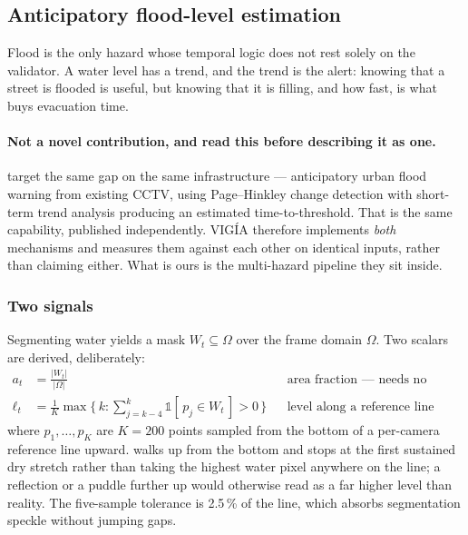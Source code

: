 \subsection{Anticipatory flood-level estimation}
\label{sec:flood-trend}

Flood is the only hazard whose temporal logic does not rest solely on the
validator. A water level has a trend, and the trend is the alert: knowing that
a street is flooded is useful, but knowing that it is filling, and how fast,
is what buys evacuation time.

\paragraph{Not a novel contribution, and read this before describing it as
one.}  target the same gap on the same
infrastructure — anticipatory urban flood warning from existing CCTV, using
Page--Hinkley change detection with short-term trend analysis producing an
estimated time-to-threshold. That is the same capability, published
independently. VIGÍA therefore implements \emph{both} mechanisms and measures
them against each other on identical inputs, rather than claiming either. What
is ours is the multi-hazard pipeline they sit inside.

\subsubsection{Two signals}

Segmenting water yields a mask $W_t \subseteq \Omega$ over the frame domain
$\Omega$. Two scalars are derived, deliberately:
\begin{align}
  a_t &= \frac{|W_t|}{|\Omega|}
     &&\text{area fraction — needs no calibration}
     \label{eq:area}\\
  \ell_t &= \frac{1}{K}\max\{\, k : \textstyle\sum_{j=k-4}^{k}
              \mathbb{1}[\, p_j \in W_t \,] > 0 \,\}
     &&\text{level along a reference line}
     \label{eq:level}
\end{align}
where $p_1, \dots, p_K$ are $K = 200$ points sampled from the bottom of a
per-camera reference line upward.  walks up from the bottom and
stops at the first sustained dry stretch rather than taking the highest water
pixel anywhere on the line; a reflection or a puddle further up would
otherwise read as a far higher level than reality. The five-sample tolerance
is 2.5\,\% of the line, which absorbs segmentation speckle without jumping
gaps.

